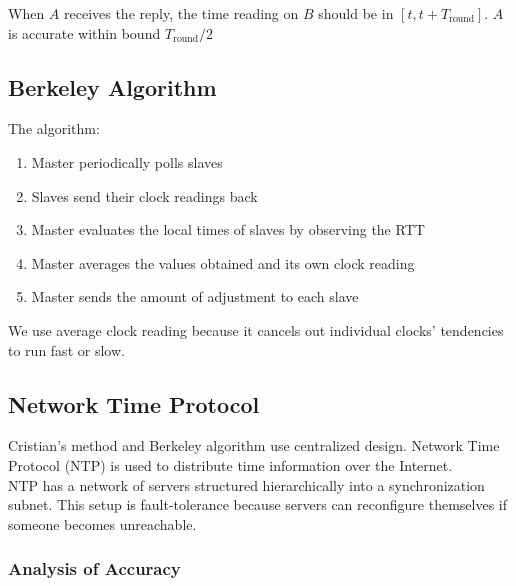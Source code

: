 \begin{multicols*}{2}
\noindent When $A$ receives the reply, the time reading on $B$ should be in $[t,t+ T_{\text{round}}]$. $A$ is accurate within bound $T_{\text{round}} / 2$

\subsection{Berkeley Algorithm}

\noindent The algorithm:
\begin{enumerate}
  \item Master periodically polls slaves
  \item Slaves send their clock readings back
  \item Master evaluates the local times of slaves by observing the RTT
  \item Master averages the values obtained and its own clock reading
  \item Master sends the amount of adjustment to each slave
\end{enumerate}

\noindent We use average clock reading because it cancels out individual clocks' tendencies to run fast or slow.

\subsection{Network Time Protocol}

\noindent Cristian's method and Berkeley algorithm use centralized design. Network Time Protocol (NTP) is used to distribute time information over the Internet. \\

\noindent NTP has a network of servers structured hierarchically into a synchronization subnet. This setup is fault-tolerance because servers can reconfigure themselves if someone becomes unreachable.

\subsubsection{Analysis of Accuracy}
\begin{center}
\end{center}
\end{multicols*}

